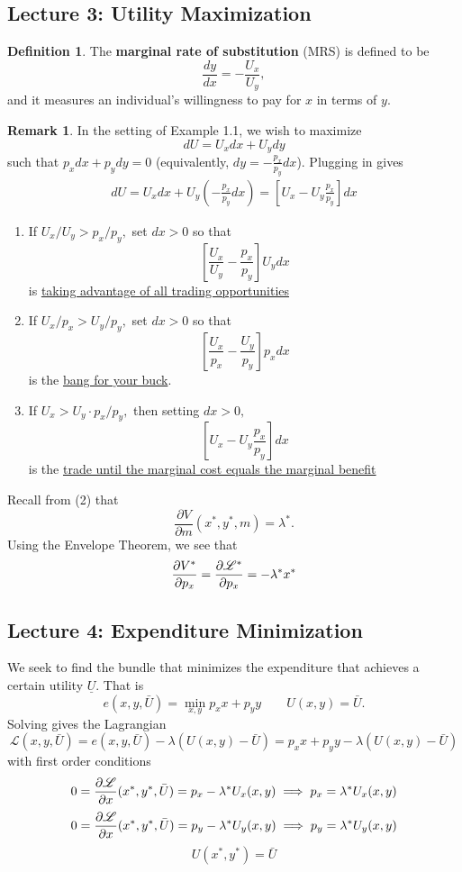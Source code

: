 \documentclass[10pt, oneside]{article}
\theoremstyle{definition}
\newtheorem{defn}{Definition}
\newtheorem{rem}{Remark}
\begin{document}
\newpage
\subsection*{Lecture 3: Utility Maximization}
\begin{defn}
    The \textbf{marginal rate of substitution} (MRS) is defined to be 
    \[\frac{dy}{dx} = -\frac{U_x}{U_y},\] and it measures an individual's willingness to pay for $x$ in terms of $y.$ 
\end{defn}

\begin{rem}
In the setting of Example 1.1, we wish to
maximize \[dU = U_x dx + U_ydy\] such that $p_x dx + p_ydy= 0$ (equivalently, $dy = -\frac{p_x}{p_y}dx$). Plugging in gives 
\begin{align}
    dU = U_xdx + U_y(-\frac{p_x}{p_y}dx) = \left[U_x - U_y\frac{p_x}{p_y}\right]dx
\end{align}
\begin{enumerate}
    \item If $U_x/U_y > p_x/p_y,$ set $dx>0$ so that 
    \[\left[\frac{U_x}{U_y} - \frac{p_x}{p_y}\right]U_y dx\] is \underline{taking advantage of all trading opportunities}
    \item If $U_x/p_x > U_y/p_y,$ set $dx>0$ so that 
    \[\left[\frac{U_x}{p_x} - \frac{U_y}{p_y}\right]p_x dx\] is the \underline{bang for your buck}.
    \item If $U_x > U_y \cdot p_x/p_y,$ then setting $dx>0,$ 
    \[\left[U_x - U_y\frac{p_x}{p_y}\right]dx\] is the \underline{trade until the marginal cost equals the marginal benefit}
\end{enumerate}
Recall from (2) that \[\frac{\partial V}{\partial m}(x^*, y^*, m) = \lambda^*.\] Using the Envelope Theorem, we see that 
\begin{align}
    \frac{\partial V^*}{\partial p_x} = \frac{\partial \cal L^*}{\partial p_x} = -\lambda^* x^*
\end{align}

\end{rem}

\subsection*{Lecture 4: Expenditure Minimization} 
We seek to find the bundle that minimizes the expenditure that achieves a certain utility $\underline{U}.$ That is 
\[e(x,y,\bar U) = \min_{x,y} p_x x + p_yy \qquad U(x,y) = \bar U.\] Solving gives the Lagrangian
\[\mathcal{L}(x,y,\bar U) = e(x,y,\bar U) - \lambda (U(x,y) - \bar U) = p_x x + p_yy- \lambda (U(x,y) - \bar U)\]
with first order conditions 
\[0=\frac{\partial \cal L}{\partial x}(x^*, y^*, \bar U) = p_x - \lambda^* U_x(x,y) \implies p_x = \lambda^* U_x(x,y)\]
\[0 = \frac{\partial \cal L}{\partial x}(x^*, y^*, \bar U) = p_y - \lambda^* U_y(x,y) \implies p_y = \lambda^* U_y(x,y)\]
\[U(x^*, y^*)= \bar U\]
\end{document}
